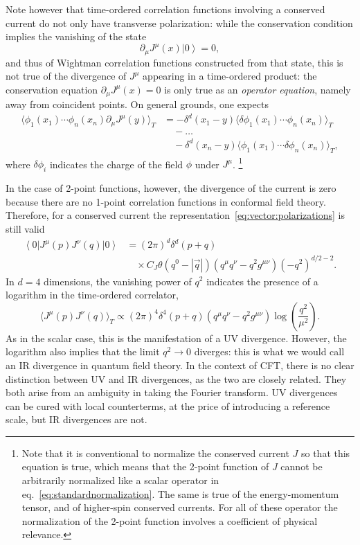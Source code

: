 \documentclass[a4paper,12pt]{article}
\newcommand{\ket}[1]{\left| #1 \right\rangle}
\newcommand{\bra}[1]{\left\langle #1 \right|}
\numberwithin{equation}{section}
\begin{document}
Note however that time-ordered correlation functions involving a conserved current do not only have transverse polarization: while the conservation condition implies the vanishing of the state
\begin{equation}
	\partial_\mu J^\mu(x) \ket{0} = 0,
\end{equation}
and thus of Wightman correlation functions constructed from that state, this is not true of the divergence of $J^\mu$ appearing in a time-ordered product: the conservation equation $\partial_\mu J^\mu(x) = 0$ is only true as an \emph{operator equation}, namely away from coincident points. On general grounds, one expects
\begin{align}
	\langle \phi_1(x_1) \cdots \phi_n(x_n)
	\partial_\mu J^\mu(y) \rangle_T
	&= - \delta^d(x_1 - y)
	\langle \delta\phi_1(x_1) \cdots \phi_n(x_n)  \rangle_T
	\nonumber \\
	& \quad - \ldots
	\nonumber \\
	& \quad -\delta^d(x_n - y)
	\langle \phi_1(x_1) \cdots \delta\phi_n(x_n)  \rangle_T,
\end{align}
where $\delta\phi_i$ indicates the charge of the field $\phi$ under $J^\mu$.%
%
\footnote{Note that it is conventional to normalize the conserved current $J$ so that this equation is true, which means that the 2-point function of $J$ cannot be arbitrarily normalized like a scalar operator in eq.~\eqref{eq:standardnormalization}. The same is true of the energy-momentum tensor, and of higher-spin conserved currents. For all of these operator the normalization of the 2-point function involves a coefficient of physical relevance.}
%

In the case of 2-point functions, however, the divergence of the current is zero because there are no 1-point correlation functions in conformal field theory. Therefore, for a conserved current the representation~\eqref{eq:vector:polarizations} is still valid
\begin{align}
	\bra{0} J^\mu(p) J^\nu(q) \ket{0}
	&= (2\pi)^d \delta^d(p + q) 
	\nonumber \\
	& \quad \times C_J
	\theta\left( q^0 - \left| \vec{q} \right| \right)
	( q^\mu q^\nu - q^2 g^{\mu\nu} )
	(-q^2)^{d/2 - 2}.
\end{align}
In $d = 4$ dimensions, the vanishing power of $q^2$ indicates the presence of a logarithm in the time-ordered correlator,
\begin{equation}
	\langle J^\mu(p) J^\nu(q) \rangle_T
	\propto (2\pi)^4 \delta^4(p + q)
	( q^\mu q^\nu - q^2 g^{\mu\nu} )
	\log\left( \frac{q^2}{\mu^2} \right).
\end{equation}
As in the scalar case, this is the manifestation of a UV divergence. However, the logarithm also implies that the limit $q^2 \to 0$ diverges: this is what we would call an IR divergence in quantum field theory. 
In the context of CFT, there is no clear distinction between UV and IR divergences, as the two are closely related. They both arise from an ambiguity in taking the Fourier transform. UV divergences can be cured with local counterterms, at the price of introducing a reference scale, but IR divergences are not.
\end{document}
